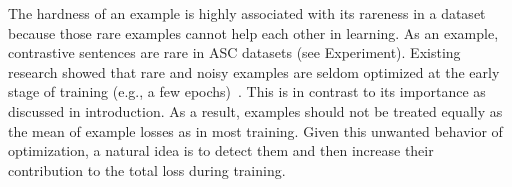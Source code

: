 The hardness of an example is highly associated with its rareness in a dataset because those rare examples cannot help each other in learning.
As an example, contrastive sentences are rare in ASC datasets (see Experiment).
Existing research showed that rare and noisy examples are seldom optimized at the early stage of training (e.g., a few epochs)~\cite{gao2016sample}. 
This is in contrast to its importance as discussed in introduction.
As a result, examples should not be treated equally as the mean of example losses as in most training.
Given this unwanted behavior of optimization, a natural idea is to detect them and then increase their contribution to the total loss during training.

